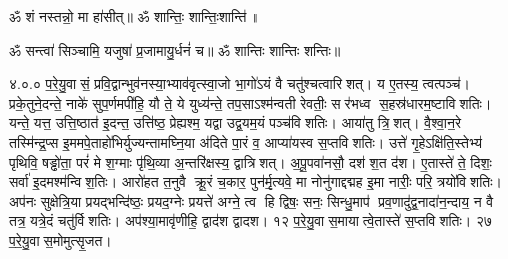 ॐ शं नस्तन्नो॒ मा हा॑सीत्॥ ॐ शान्तिः॒ शान्तिः॒शान्ति॑॥

\closesection
\clearpage

\setcounter{anuvakam}{0}
ॐ सन्त्वा॑ सिञ्चामि॒ यजुषा॑ प्र॒जामायु॒र्धनं॑ च॥ ॐ शान्तिः  शान्तिः  शन्तिः॥

४.०.०
प॒रे॒यु॒वासं॒ प्रवि॒द्वान्भुव॑नस्या॒भ्याव॑वृत्स्वा॒जो भा॒गो॑ऽयं वै चतु॑श्चत्वारिशत्। य ए॒तस्य॒ त्वत्पञ्च॑। प्रके॒तुने॒दन्ते॒ नाके॑ सुप॒र्णमपी॑हि॒ यौ ते॒ ये युध्य॑न्ते॒ तप॒साऽश्म॑न्वती रेवतीः॒ सर॑भध्व स॒हस्र॑धारम॒ष्टाविशतिः। यन्ते॒ यत्त॒ उत्ति॒ष्ठात॑ इ॒दन्त॒ उत्ति॑ष्ठ॒ प्रेह्यश्म॒\an{} यद्वा उद्व॒यम॒यं पञ्च॑विशतिः। आया॑तु त्रि॒शत्। वै॒श्वा॒न॒रे तस्मि॑न्द्र॒प्स इ॒ममपे॒ताहो॑भिर्युज्यन्तामघ्नि॒या अ॑दिते पा॒रं व॒ आप्या॑यस्व स॒प्तविशतिः। उत्ते॑ गृ॒हेऽक्षि॑ति॒स्तेभ्य॑ पृथिवि॒ षड्ढो॑ता॒ परं॑ मे श॒ग्माः पृ॑थि॒व्या अ॒न्तरि॑क्षस्य॒ द्वात्रिशत्। अ॒पू॒पवा॑नसौ॒ दश॑ श॒त द॑श। ए॒तास्ते॑ ते॒ दिशः॒ सर्वा॑ इ॒दमश्म॑न्विश॒तिः। आरो॑हत त॒नुवै क्रू॒रं च॒कार॒ पुन॑र्मृ॒त्यवे॒ मा नोनु॑गाद्दद्मह इ॒मा नारीः॒ परि॒ त्रयो॑विशतिः। अप॑नः सुक्षेत्रि॒या प्रयद्भन्दि॑ष्ठः॒ प्रयद॒ग्नेः प्रयत्ते॑ अग्ने॒ त्व हि द्विषः॒ सनः॒ सिन्धु॒माप॑ प्रव॒णादु॑द्व॒नादा॑न॒न्दाय॒ न वै तत्र॒ यत्रे॒दं चतु॑र्विशतिः। अप॑श्या॒मावृ॑णीहि॒ द्वाद॑श द्वादश। १२ प॒रे॒यु॒वास॒मायात्वे॒तास्ते॑ स॒प्तविशतिः। २७ प॒रे॒यु॒वास॒मोमुत्सृ॒जत।

